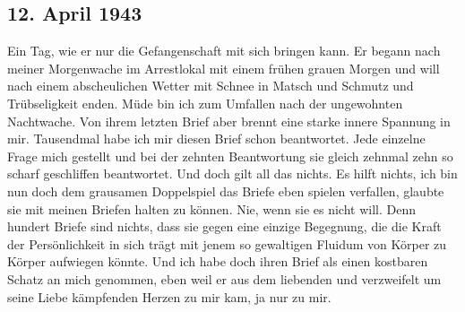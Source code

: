 \subsection{12. April 1943}

Ein Tag, wie er nur die Gefangenschaft mit sich bringen kann.
Er begann nach meiner Morgenwache im Arrestlokal mit einem fr\"{u}hen grauen Morgen und will nach einem abscheulichen Wetter mit Schnee in Matsch und Schmutz und Tr\"{u}bseligkeit enden.
M\"{u}de bin ich zum Umfallen nach der ungewohnten Nachtwache.
Von ihrem letzten Brief aber brennt eine starke innere Spannung in mir.
Tausendmal habe ich mir diesen Brief schon beantwortet.
Jede einzelne Frage mich gestellt und bei der zehnten Beantwortung sie gleich zehnmal zehn so scharf geschliffen beantwortet.
Und doch gilt all das nichts.
Es hilft nichts, ich bin nun doch dem grausamen Doppelspiel das Briefe eben spielen verfallen, glaubte sie mit meinen Briefen halten zu k\"{o}nnen.
Nie, wenn sie es nicht will.
Denn hundert Briefe sind nichts, dass sie gegen eine einzige Begegnung, die die Kraft der Pers\"{o}nlichkeit in sich tr\"{a}gt mit jenem so gewaltigen Fluidum von K\"{o}rper zu K\"{o}rper aufwiegen k\"{o}nnte.
Und ich habe doch ihren Brief als einen kostbaren Schatz an mich genommen, eben weil er aus dem liebenden und verzweifelt um seine Liebe k\"{a}mpfenden Herzen zu mir kam, ja nur zu mir.


\clearpage
